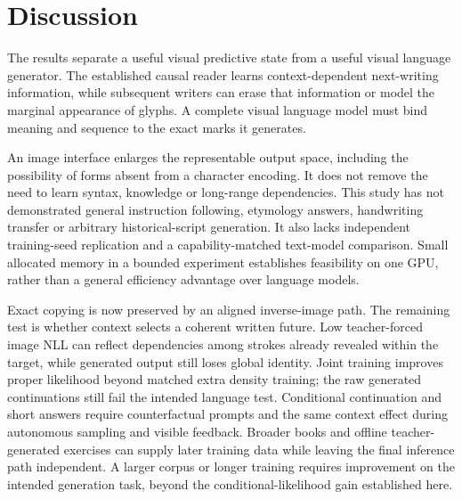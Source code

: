 
\section*{Discussion}
The results separate a useful visual predictive state from a useful visual
language generator. The established causal reader learns context-dependent
next-writing information, while subsequent writers can erase that information
or model the marginal appearance of glyphs. A complete visual language model
must bind meaning and sequence to the exact marks it generates.

An image interface enlarges the representable output space, including the
possibility of forms absent from a character encoding. It does not remove the
need to learn syntax, knowledge or long-range dependencies. This study has not
demonstrated general instruction following, etymology answers, handwriting
transfer or arbitrary historical-script generation. It also lacks independent
training-seed replication and a capability-matched text-model comparison.
Small allocated memory in a bounded experiment establishes feasibility on one
GPU, rather than a general efficiency advantage over language models.

Exact copying is now preserved by an aligned inverse-image path. The remaining
test is whether context selects a coherent written future. Low teacher-forced
image NLL can reflect dependencies among strokes already revealed within the
target, while generated output still loses global identity. Joint training
improves proper likelihood beyond matched extra density training; the raw
generated continuations still fail the intended language test. Conditional
continuation and short answers require counterfactual prompts and the same
context effect during autonomous sampling and visible feedback.
Broader books and offline teacher-generated exercises can supply later
training data while leaving the final inference path independent. A larger
corpus or longer training requires improvement on the intended generation
task, beyond the conditional-likelihood gain established here.

